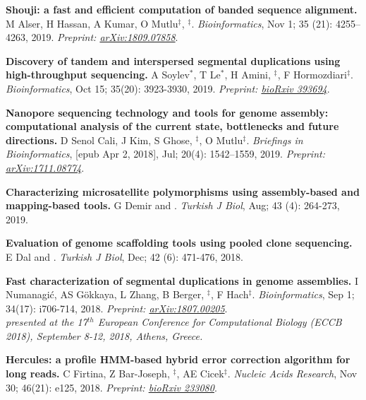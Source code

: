 \vspace{-.2cm}
    {\bf Shouji: a fast and efficient computation of banded sequence alignment.} M Alser, H Hassan, A Kumar, O Mutlu$^\ddag$, \calkan{}$^\ddag$.
    {\it Bioinformatics}, Nov 1; 35 (21): 4255–4263, 2019. \textit{Preprint: \href{https://doi.org/10.48550/arXiv.1809.07858}{arXiv:1809.07858}}.

\vspace{-.2cm}
    {\bf Discovery of tandem and interspersed segmental duplications using high-throughput sequencing.} A Soylev$^\ast$, T Le$^\ast$, H Amini, \calkan{}$^\ddag$, F Hormozdiari$^\ddag$.
    {\it Bioinformatics}, Oct 15; 35(20): 3923-3930, 2019. \textit{Preprint: \href{https://doi.org/10.1101/393694}{bioRxiv 393694}}.
        
\vspace{-.2cm}
    {\bf Nanopore sequencing technology and tools for genome assembly: computational analysis of the current state, bottlenecks and future directions.}
    D Senol Cali, J Kim, S Ghose, \calkan{}$^\ddag$, O Mutlu$^\ddag$.
    {\em Briefings in Bioinformatics}, [epub Apr 2, 2018], Jul; 20(4): 1542–1559, 2019. \textit{Preprint: \href{https://doi.org/10.48550/arXiv.1711.08774}{arXiv:1711.08774}}.
   

\vspace{-.2cm}
    {\bf Characterizing microsatellite polymorphisms using assembly-based and mapping-based tools.}  G Demir and \calkan{}. {\em Turkish J Biol}, Aug; 43 (4): 264-273, 2019.

\vspace{-.2cm}
    {\bf Evaluation of genome scaffolding tools using pooled clone sequencing.}  E Dal and \calkan{}. {\em Turkish J Biol}, Dec; 42 (6): 471-476, 2018.

         \clearpage
         
\vspace{-.2cm}
    {\bf Fast characterization of segmental duplications in genome assemblies.}
    I Numanagić, AS Gökkaya, L Zhang, B Berger, \calkan{}$^\ddag$, F Hach$^\ddag$.
    {\em Bioinformatics}, Sep 1; 34(17): i706-714, 2018. \textit{Preprint: \href{https://doi.org/10.48550/arXiv.1807.00205}{arXiv:1807.00205}}.\\
    \hspace*{1cm}
    {\footnotesize \em presented at the 17$^{th}$ European Conference for Computational Biology (ECCB 2018), September 8-12, 2018, Athens, Greece.}

\vspace{-.2cm}
    {\bf Hercules: a profile HMM-based hybrid error correction algorithm for long reads.}
    C Firtina, Z Bar-Joseph, \calkan{}$^\ddag$, AE Cicek$^\ddag$.
    {\it Nucleic Acids Research}, Nov 30; 46(21): e125, 2018. \textit{Preprint: \href{https://doi.org/10.1101/233080}{bioRxiv 233080}}.
          
